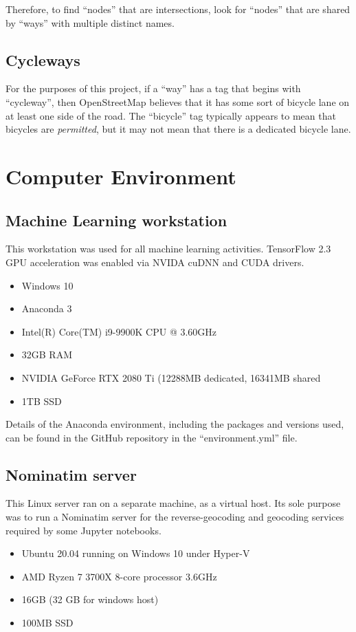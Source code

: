 \documentclass[11pt,twoside]{report}
\begin{document}
Therefore, to find ``nodes'' that are intersections, look for ``nodes'' that are shared by ``ways'' with multiple distinct names.

\section{Cycleways}
\label{osm:cycleways}

For the purposes of this project, if a ``way'' has a tag that begins with ``cycleway'', then OpenStreetMap believes that it has some sort of bicycle lane on at least one side of the road.  The ``bicycle'' tag typically appears to mean that bicycles are \textit{permitted}, but it may not mean that there is a dedicated bicycle lane.


\chapter{Computer Environment}
\label{a:environment}

\section{Machine Learning workstation}
\label{a:computer}

This workstation was used for all machine learning activities.  TensorFlow 2.3 GPU acceleration was enabled via NVIDA cuDNN and CUDA drivers.

\begin{itemize}
\item{Windows 10}
\item{Anaconda 3}
\item{Intel(R) Core(TM) i9-9900K CPU @ 3.60GHz}	
\item{32GB RAM}
\item{NVIDIA GeForce RTX 2080 Ti (12288MB dedicated, 16341MB shared}
\item{1TB SSD}
\end{itemize}

Details of the Anaconda environment, including the packages and versions used, can be found in the GitHub repository in the ``environment.yml'' file.


\section{Nominatim server}
\label{a:nominatim}

This Linux server ran on a separate machine, as a virtual host.  Its sole purpose was to run a Nominatim server for the reverse-geocoding and geocoding services required by some Jupyter notebooks.

\begin{itemize}
\item{Ubuntu 20.04 running on Windows 10 under Hyper-V}
\item{AMD Ryzen 7 3700X 8-core processor 3.6GHz}
\item{16GB (32 GB for windows host)}
\item{100MB SSD}
\end{itemize}


\cleardoublepage


\end{document}
